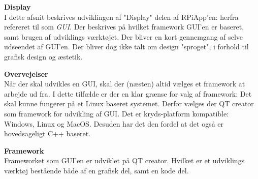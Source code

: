 \documentclass[Softwaredesign/Softwaredesign_main.tex]{subfiles}
\begin{document}
\textbf{Display}\\
I dette afsnit beskrives udviklingen af "Display" delen af RPiApp'en: herfra refereret til som \textit{GUI}. Der beskrives på hvilket framework GUI'en er baseret, samt brugen af udviklings værktøjet. Der bliver en kort gennemgang af selve udseendet af GUI'en.  Der bliver dog ikke talt om design "sproget", i forhold til grafisk design og æstetik. 

\textbf{Overvejelser}\\
Når der skal udvikles en GUI, skal der (næsten) altid vælges et framework at arbejde ud fra. I dette tilfælde er der en klar grænse for valg af framework: Det skal kunne fungerer på et Linux baseret systemet. Derfor vælges der QT creator som framework for udvikling af GUI. Det er kryds-platform kompatible: Windows, Linux og MacOS. Desuden har det den fordel at det også er hovedsageligt  C++ baseret. 

\textbf{Framework}\\
Frameworket som GUI'en er udviklet på QT creator. Hvilket er et udviklings værktøj bestående både af en grafisk del, samt en kode del. 
\end{document}
